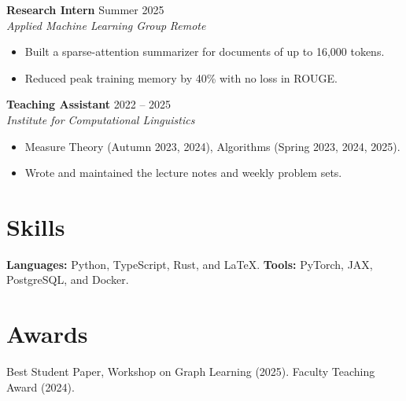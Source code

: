 \documentclass[11pt,a4paper]{article}
\newcommand{\entry}[4]{\textbf{#1} \hfill #2 \\ \textit{#3} \hfill \textit{#4} \par\vspace{2pt}}
\begin{document}
\entry{Research Intern}{Summer 2025}{Applied Machine Learning Group}{Remote}
\begin{itemize}
  \item Built a sparse-attention summarizer for documents of up to 16{,}000 tokens.
  \item Reduced peak training memory by 40\% with no loss in ROUGE.
\end{itemize}

\entry{Teaching Assistant}{2022 -- 2025}{Institute for Computational Linguistics}{}
\begin{itemize}
  \item Measure Theory (Autumn 2023, 2024), Algorithms (Spring 2023, 2024, 2025).
  \item Wrote and maintained the lecture notes and weekly problem sets.
\end{itemize}

\section{Skills}

\textbf{Languages:} Python, TypeScript, Rust, and \LaTeX. \quad \textbf{Tools:} PyTorch, JAX, PostgreSQL, and Docker.

\section{Awards}

Best Student Paper, Workshop on Graph Learning (2025). \quad Faculty Teaching Award (2024).
\end{document}
